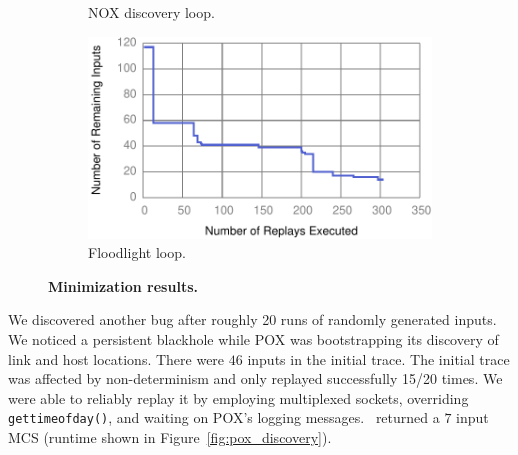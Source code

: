 \begin{figure}[!htb]
\begin{subfigure}{0.33\textwidth}
    \caption[]{\label{fig:nox_discovery} NOX discovery loop. }
\end{subfigure}\hfill
\begin{subfigure}{0.33\textwidth}
    \includegraphics[width=\textwidth]{../graphs/runtime/floodlight_loop.pdf}
    \caption[]{\label{fig:fl_loop} Floodlight loop. }
\end{subfigure}
\caption{\textbf{Minimization results.}}
\end{figure}

 We discovered another bug
after roughly 20 runs of randomly generated inputs. We noticed a persistent
blackhole while POX was bootstrapping its discovery of link and host locations.
There were $46$ inputs in the initial trace. The initial trace was affected by
non-determinism and only replayed successfully 15/20 times.
We were able to reliably replay it by employing multiplexed sockets, overriding {\tt gettimeofday()},
and waiting on POX's logging messages. \projectname~returned a $7$ input MCS
(runtime shown in Figure~\ref{fig:pox_discovery}).



